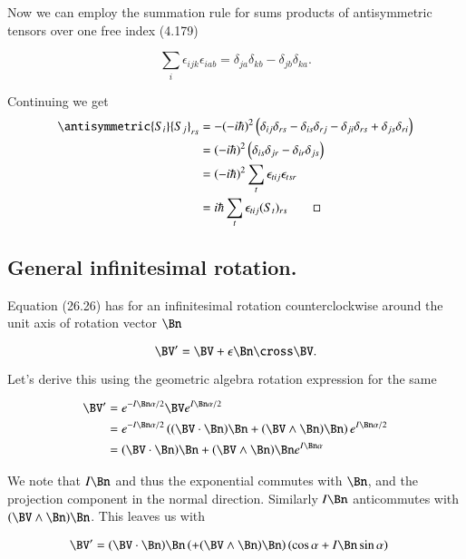 Now we can employ the summation rule for sums products of antisymmetric tensors over one free index (4.179) 

\begin{equation}\label{eqn:desaiCh26:50}
\sum_i 
\epsilon_{ijk} \epsilon_{iab}
= 
\delta_{ja}
\delta_{kb}
-\delta_{jb}
\delta_{ka}.
\end{equation}

Continuing we get
\begin{align*}
{\antisymmetric{S_i}{S_j}}_{rs} 
&=
-(-i\hbar)^2 \left(
\delta_{ij}
\delta_{rs}
-\delta_{is}
\delta_{rj}
-\delta_{ji}
\delta_{rs}
+\delta_{js}
\delta_{ri} \right) \\
&=
(-i\hbar)^2 \left( 
\delta_{is}
\delta_{jr}
-
\delta_{ir} 
\delta_{js}
\right)
\\
&=
(-i\hbar)^2 \sum_t \epsilon_{tij} \epsilon_{tsr}
\\
&=
i\hbar \sum_t \epsilon_{tij} (S_t)_{rs}
\qquad\square
\end{align*}

\subsection{General infinitesimal rotation.}

Equation (26.26) has for an infinitesimal rotation counterclockwise around the unit axis of rotation vector $\Bn$

\begin{equation}\label{eqn:desaiCh26:60}
\BV' = \BV + \epsilon \Bn \cross \BV.
\end{equation}

Let's derive this using the geometric algebra rotation expression for the same

\begin{align*}
\BV' 
&=
e^{-I\Bn \alpha/2}
\BV 
e^{I\Bn \alpha/2} \\
&=
e^{-I\Bn \alpha/2}
\left(
(\BV \cdot \Bn)\Bn
+(\BV \wedge \Bn)\Bn
\right)
e^{I\Bn \alpha/2} \\
&=
(\BV \cdot \Bn)\Bn
+(\BV \wedge \Bn)\Bn
e^{I\Bn \alpha}
\end{align*}

We note that $I\Bn$ and thus the exponential commutes with $\Bn$, and the projection component in the normal direction.  Similarly $I\Bn$ anticommutes with $(\BV \wedge \Bn) \Bn$.  This leaves us with

\begin{align*}
\BV' 
&=
(\BV \cdot \Bn)\Bn
\left(
+(\BV \wedge \Bn)\Bn
\right)
( \cos \alpha + I \Bn \sin\alpha)
\end{align*}

